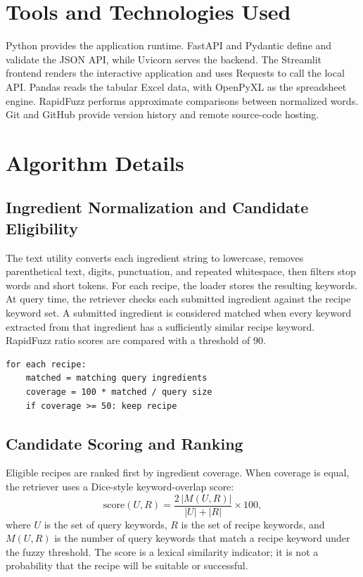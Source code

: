 \documentclass[12pt,a4paper]{report}
\begin{document}
\section{Tools and Technologies Used}
\label{sec:tools}

Python provides the application runtime. FastAPI and Pydantic define and validate the JSON API, while Uvicorn serves the backend. The Streamlit frontend renders the interactive application and uses Requests to call the local API. Pandas reads the tabular Excel data, with OpenPyXL as the spreadsheet engine. RapidFuzz performs approximate comparisons between normalized words. Git and GitHub provide version history and remote source-code hosting.

\section{Algorithm Details}
\label{sec:algorithms}

\subsection{Ingredient Normalization and Candidate Eligibility}
\label{subsec:algo1}

The text utility converts each ingredient string to lowercase, removes parenthetical text, digits, punctuation, and repeated whitespace, then filters stop words and short tokens. For each recipe, the loader stores the resulting keywords. At query time, the retriever checks each submitted ingredient against the recipe keyword set. A submitted ingredient is considered matched when every keyword extracted from that ingredient has a sufficiently similar recipe keyword. RapidFuzz ratio scores are compared with a threshold of 90.

\begin{small}
\begin{verbatim}
for each recipe:
    matched = matching query ingredients
    coverage = 100 * matched / query size
    if coverage >= 50: keep recipe
\end{verbatim}
\end{small}

\subsection{Candidate Scoring and Ranking}
\label{subsec:algo2}

Eligible recipes are ranked first by ingredient coverage. When coverage is equal, the retriever uses a Dice-style keyword-overlap score:
\[
\mathrm{score}(U,R) =
\frac{2\,|M(U,R)|}{|U|+|R|}\times 100,
\]
where \(U\) is the set of query keywords, \(R\) is the set of recipe keywords, and \(M(U,R)\) is the number of query keywords that match a recipe keyword under the fuzzy threshold. The score is a lexical similarity indicator; it is not a probability that the recipe will be suitable or successful.
\end{document}
